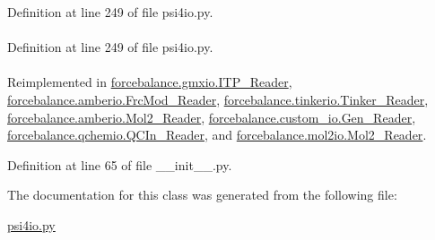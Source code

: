 \-Definition at line 249 of file psi4io.\-py.

\hypertarget{classforcebalance_1_1psi4io_1_1Grid__Reader_a9a2872913fab88d4a8586123f66b6f41}{
\paragraph[{radii}]{}}\label{classforcebalance_1_1psi4io_1_1Grid__Reader_a9a2872913fab88d4a8586123f66b6f41}


\-Definition at line 249 of file psi4io.\-py.

\hypertarget{classforcebalance_1_1BaseReader_a48ef0584a1b6b4b6f8eb741ad8465db8}{
\paragraph[{suffix}]{}}\label{classforcebalance_1_1BaseReader_a48ef0584a1b6b4b6f8eb741ad8465db8}


\-Reimplemented in \hyperlink{classforcebalance_1_1gmxio_1_1ITP__Reader_ab35c32e7ecf74028641613f90906bd37}{forcebalance.\-gmxio.\-I\-T\-P\-\_\-\-Reader}, \hyperlink{classforcebalance_1_1amberio_1_1FrcMod__Reader_ad25c7e07aadb587268f3beb7a379766c}{forcebalance.\-amberio.\-Frc\-Mod\-\_\-\-Reader}, \hyperlink{classforcebalance_1_1tinkerio_1_1Tinker__Reader_a7078ca5338dff178edf5afb05a1f32c8}{forcebalance.\-tinkerio.\-Tinker\-\_\-\-Reader}, \hyperlink{classforcebalance_1_1amberio_1_1Mol2__Reader_a76b4f0ec6731d7072da6be5768ebf979}{forcebalance.\-amberio.\-Mol2\-\_\-\-Reader}, \hyperlink{classforcebalance_1_1custom__io_1_1Gen__Reader_a408f5717e02bcc0d87b8e60bd8b0714e}{forcebalance.\-custom\-\_\-io.\-Gen\-\_\-\-Reader}, \hyperlink{classforcebalance_1_1qchemio_1_1QCIn__Reader_a1ff6018724f2760bb6dd32dd3c854328}{forcebalance.\-qchemio.\-Q\-C\-In\-\_\-\-Reader}, and \hyperlink{classforcebalance_1_1mol2io_1_1Mol2__Reader_a39adb792b05aab536e3376ecf2ec5778}{forcebalance.\-mol2io.\-Mol2\-\_\-\-Reader}.



\-Definition at line 65 of file \-\_\-\-\_\-init\-\_\-\-\_\-.\-py.



\-The documentation for this class was generated from the following file\-:\begin{DoxyCompactItemize}
\item 
\hyperlink{psi4io_8py}{psi4io.\-py}\end{DoxyCompactItemize}
